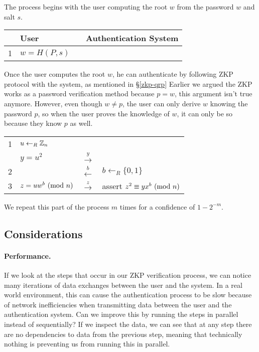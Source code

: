 \bigskip
\noindent
The process begins with the user computing the root $w$ from the password $w$ and salt $s$.

\begin{table}[h!]
	\centering
	\begin{tabular}{p{}|p{}|p{}|p{}}
  		& User & & Authentication System\\
  		\hline
		1 & $w = H(P, s)$ & & \\ 
	\end{tabular}
\end{table}

\noindent
Once the user computes the root $w$, he can authenticate by following ZKP protocol with the system, as mentioned in \S\ref{zkp-qrp}
Earlier we argued the ZKP works as a password verification method because $p = w$, this argument isn't true anymore.
However, even though $w \not = p$, the user can only derive $w$ knowing the password $p$, so when the user proves the knowledge of $w$, it can only be so because they know $p$ as well.

\begin{table}[h!]
	\centering
	\begin{tabular}{p{}|p{}|p{}|p{}}
  		&  & & \\
		\hline
		1 & $u \leftarrow_R \Bbb{Z}_{n}$ &  \\
		& $y = u^2$ & $\xrightarrow{y}$ \\
		2 & & $\xleftarrow{b}$ & $b \leftarrow_R \{0, 1\} $ \\
		3 & $z = uw^b \ (\mathrm{mod}\ n) $ & $\xrightarrow{z}$ & assert $z^2 \equiv yx^b \ (\mathrm{mod}\ n)$\\ 
	\end{tabular}
\end{table}

\noindent
We repeat this part of the process $m$ times for a confidence of $1 - 2^{-m}$.
 
\subsection{Considerations}
\label{section:pefromance-considerations}
\paragraph{Performance.}
If we look at the steps that occur in our ZKP verification process, we can notice many iterations of data exchanges between the user and the system.
In a real world environment, this can cause the authentication process to be slow because of network inefficiencies when transmitting data between the user and the authentication system.
Can we improve this by running the steps in parallel instead of sequentially?
If we inspect the data, we can see that at any step there are no dependencies to data from the previous step, meaning that technically nothing is preventing us from running this in parallel.

